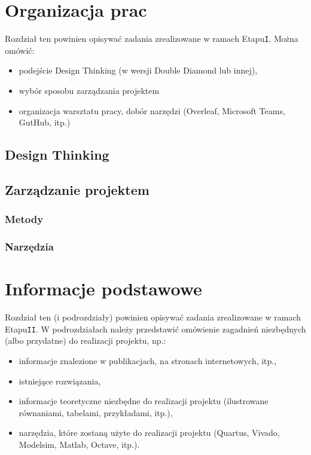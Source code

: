 \documentclass[a4paper,titleauthor]{mwart}
\begin{document}
	
\section{Organizacja prac}
\label{sec:organizacja}

Rozdział ten powinien opisywać zadania zrealizowane w ramach Etapu\texttt{I}. Można omówić:

\begin{itemize}
	\item podejście Design Thinking (w wersji Double Diamond lub innej),
	\item wybór sposobu zarządzania projektem
	\item organizacja warsztatu pracy, dobór narzędzi (Overleaf, Microsoft Teams, GutHub, itp.)
\end{itemize}

\subsection{Design Thinking}
\label{sec:design_thinking}

\subsection{Zarządzanie projektem}
\label{sec:zarządzanie_projektem}

\subsubsection{Metody}
\label{sec:narzędzia}

\subsubsection{Narzędzia}
\label{sec:narzędzia}

\section{Informacje podstawowe}
\label{sec:informacje_podstawowe}

Rozdział ten (i podrozdziały) powinien opisywać zadania zrealizowane w ramach Etapu\texttt{II}. W podrozdziałach należy przedstawić omówienie zagadnień niezbędnych (albo przydatne) do realizacji projektu, np.:

\begin{itemize}
	\item informacje znalezione w publikacjach, na stronach internetowych, itp.,
	\item istniejące rozwiązania,
	\item informacje teoretyczne niezbędne do realizacji projektu (ilustrowane równaniami, tabelami, przykładami, itp.),
	\item narzędzia, które zostaną użyte do realizacji projektu (Quartus, Vivado, Modelsim, Matlab, Octave, itp.).
\end{itemize}
\end{document}
